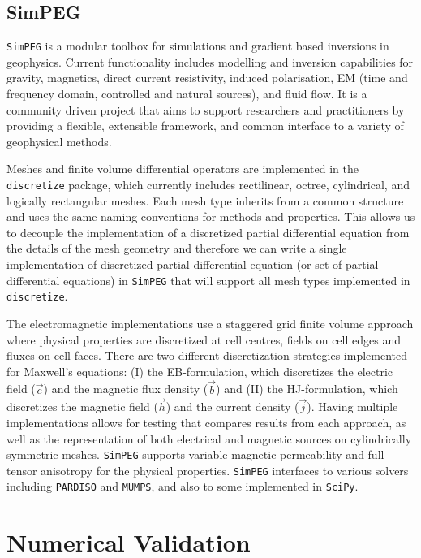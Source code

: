 \documentclass[extra, camera,%
]{gji}
\newcommand{\simpeg}{\texttt{SimPEG}\xspace}
\newcommand{\discretize}{\texttt{discretize}\xspace}
\begin{document}
\subsection{SimPEG}

\simpeg is a modular toolbox for simulations and gradient based inversions in geophysics. Current functionality includes modelling and inversion capabilities for gravity, magnetics, direct current resistivity, induced polarisation, EM (time and frequency domain, controlled and natural sources), and fluid flow. It is a community driven project that aims to support researchers and practitioners by providing a flexible, extensible framework, and common interface to a variety of geophysical methods.

Meshes and finite volume differential operators are implemented in the \discretize package, which currently includes rectilinear, octree, cylindrical, and logically rectangular meshes. Each mesh type inherits from a common structure and uses the same naming conventions for methods and properties. This allows us to decouple the implementation of a discretized partial differential equation from the details of the mesh geometry and therefore we can write a single implementation of discretized partial differential equation (or set of partial differential equations) in \simpeg that will support all mesh types implemented in \discretize.

The electromagnetic implementations use a staggered grid finite volume approach where physical properties are discretized at cell centres, fields on cell edges and fluxes on cell faces. There are two different discretization strategies implemented for Maxwell's equations: (I) the EB-formulation, which discretizes the electric field ($\vec{e}$) and the magnetic flux density ($\vec{b}$) and (II) the HJ-formulation, which discretizes the magnetic field ($\vec{h}$) and the current density ($\vec{j}$). Having multiple implementations allows for testing that compares results from each approach, as well as the representation of both electrical and magnetic sources on cylindrically symmetric meshes. \simpeg supports variable magnetic permeability and full-tensor anisotropy for the physical properties. \simpeg interfaces to various solvers including \texttt{PARDISO} and \texttt{MUMPS}, and also to some implemented in \texttt{SciPy}.

\section{Numerical Validation}
\end{document}
